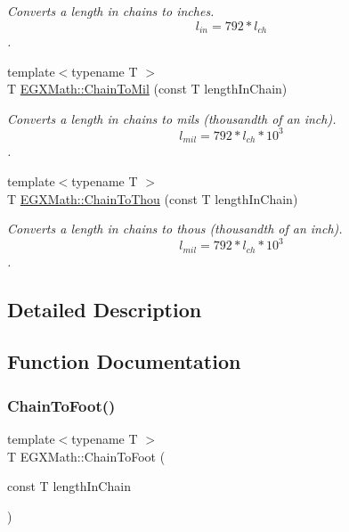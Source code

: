 \begin{DoxyCompactItemize}
\begin{DoxyCompactList}\small\item\em Converts a length in chains to inches. \[ l_{in}= 792 * l_{ch} \]. \end{DoxyCompactList}\item 
{\footnotesize template$<$typename T $>$ }\\T \mbox{\hyperlink{group___e_g_x_math-_conversions-_length_conversions-_imperial-_chain-_imperial_gae1276611dce26e23deae1b0379b4394d}{E\+G\+X\+Math\+::\+Chain\+To\+Mil}} (const T length\+In\+Chain)
\begin{DoxyCompactList}\small\item\em Converts a length in chains to mils (thousandth of an inch). \[ l_{mil}=792 * l_{ch} * 10^{3} \]. \end{DoxyCompactList}\item 
{\footnotesize template$<$typename T $>$ }\\T \mbox{\hyperlink{group___e_g_x_math-_conversions-_length_conversions-_imperial-_chain-_imperial_ga64cd46f80e3af5d7ca664456080ef6a3}{E\+G\+X\+Math\+::\+Chain\+To\+Thou}} (const T length\+In\+Chain)
\begin{DoxyCompactList}\small\item\em Converts a length in chains to thous (thousandth of an inch). \[ l_{mil}= 792 * l_{ch} * 10^{3} \]. \end{DoxyCompactList}\end{DoxyCompactItemize}


\subsection{Detailed Description}


\subsection{Function Documentation}
\mbox{\label{group___e_g_x_math-_conversions-_length_conversions-_imperial-_chain-_imperial_gab1249a8d1535d07fcb4844d687133a49}} 
\subsubsection{\texorpdfstring{Chain\+To\+Foot()}{ChainToFoot()}}
{\footnotesize\ttfamily template$<$typename T $>$ \\
T E\+G\+X\+Math\+::\+Chain\+To\+Foot (\begin{DoxyParamCaption}\item[{const T}]{length\+In\+Chain }\end{DoxyParamCaption})}



